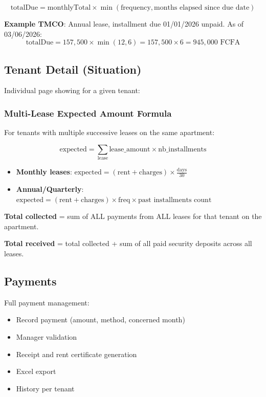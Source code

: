\documentclass[a4paper,11pt]{article}
\begin{document}
\begin{equation}
\text{totalDue} = \text{monthlyTotal} \times \min(\text{frequency}, \text{months elapsed since due date})
\end{equation}

\textbf{Example TMCO}: Annual lease, installment due 01/01/2026 unpaid. As of 03/06/2026:
$$\text{totalDue} = 157{,}500 \times \min(12, 6) = 157{,}500 \times 6 = 945{,}000 \text{ FCFA}$$

\subsection{Tenant Detail (Situation)}

Individual page showing for a given tenant:

\subsubsection{Multi-Lease Expected Amount Formula}

For tenants with multiple successive leases on the same apartment:

\begin{equation}
\text{expected} = \sum_{\text{lease}} \text{lease\_amount} \times \text{nb\_installments}
\end{equation}

\begin{itemize}
  \item \textbf{Monthly leases}: $\text{expected} = (\text{rent} + \text{charges}) \times \frac{\text{days}}{30}$
  \item \textbf{Annual/Quarterly}: $\text{expected} = (\text{rent} + \text{charges}) \times \text{freq} \times \text{past installments count}$
\end{itemize}

\textbf{Total collected} = sum of ALL payments from ALL leases for that tenant on the apartment.

\textbf{Total received} = total collected + sum of all paid security deposits across all leases.

\subsection{Payments}

Full payment management:
\begin{itemize}
  \item Record payment (amount, method, concerned month)
  \item Manager validation
  \item Receipt and rent certificate generation
  \item Excel export
  \item History per tenant
\end{itemize}
\end{document}
